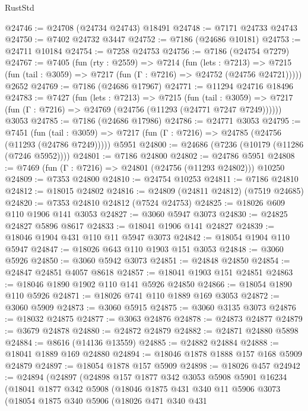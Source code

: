 \begin{lexlean}{RustStd}
\begin{coremodule}
{\begin{coremodule}
{{{{{{{{{{{{{{{{{{{{{{{{{{{{{{{{@24746 := @24708 (@24734 @24743) @18491
@24748 := @7171 @24733 @24743
@24750 := @7402 @24732 @3447
@24752 := @7186 (@24686 @10181)
@24753 := @24711 @10184
@24754 := @7258 @24753
@24756 := @7186 (@24754 @7279)
@24767 := @7405
    (fun (rty : @2559) =>
    @7214
      (fun (lets : @7213) =>
      @7215 (fun (tail : @3059) => @7217 (fun (Γ : @7216) => @24752 (@24756 @24721)))))
    @2652
@24769 := @7186 (@24686 @17967)
@24771 := @11294 @24716 @18496
@24783 := @7427
    (fun (lets : @7213) =>
    @7215
      (fun (tail : @3059) =>
      @7217 (fun (Γ : @7216) => @24769 (@24756 (@11293 (@24771 @7247 @7249))))))
    @3053
@24785 := @7186 (@24686 @17986)
@24786 := @24771 @3053
@24795 := @7451
    (fun (tail : @3059) => @7217 (fun (Γ : @7216) => @24785 (@24756 (@11293 (@24786 @7249)))))
    @5951
@24800 := @24686 (@7236 (@10179 (@11286 (@7246 @5952))))
@24801 := @7186 @24800
@24802 := @24786 @5951
@24808 := @7469 (fun (Γ : @7216) => @24801 (@24756 (@11293 @24802))) @10250
@24809 := @7353 @24800
@24810 := @24754 @10253
@24811 := @7186 @24810
@24812 := @18015 @24802
@24816 := @24809 (@24811 @24812) (@7519 @24685)
@24820 := @7353 @24810 @24812 (@7524 @24753)
@24825 := @18026 @609 @110 @1906 @141 @3053
@24827 := @3060 @5947 @3073
@24830 := @24825 @24827 @5896 @8617
@24833 := @18041 @1906 @141 @24827
@24839 := @18046 @1904 @431 @110 @11 @5947 @3073
@24842 := @18054 @1904 @110 @5947
@24847 := @18026 @643 @110 @1903 @151 @3053
@24848 := @3060 @5926
@24850 := @3060 @5942 @3073
@24851 := @24848 @24850
@24854 := @24847 @24851 @4057 @8618
@24857 := @18041 @1903 @151 @24851
@24863 := @18046 @1890 @1902 @110 @141 @5926 @24850
@24866 := @18054 @1890 @110 @5926
@24871 := @18026 @741 @110 @1889 @169 @3053
@24872 := @3060 @5909
@24873 := @3060 @5915
@24875 := @3060 @3135 @3073
@24876 := @18032 @24875
@24877 := @3063 @24876
@24878 := @24873 @24877
@24879 := @3679 @24878
@24880 := @24872 @24879
@24882 := @24871 @24880 @5898
@24884 := @8616 (@14136 @13559)
@24885 := @24882 @24884
@24888 := @18041 @1889 @169 @24880
@24894 := @18046 @1878 @1888 @157 @168 @5909 @24879
@24897 := @18054 @1878 @157 @5909
@24898 := @18026 @457
@24942 := @24894
    (@24897
      (@24898
        @157
        @1877
        @342
        @3053
        @5908
        @5901
        @16234
        (@18041
          @1877
          @342
          @5908
          (@18046
            @1875
            @431
            @340
            @11
            @5906
            @3073
            (@18054
              @1875
              @340
              @5906
              (@18026
                @471
                @340
                @431
}}}}}}}}}}}}}}}}}}}}}}}}}}}}}}}}
\end{coremodule}}
\end{coremodule}
\end{lexlean}
